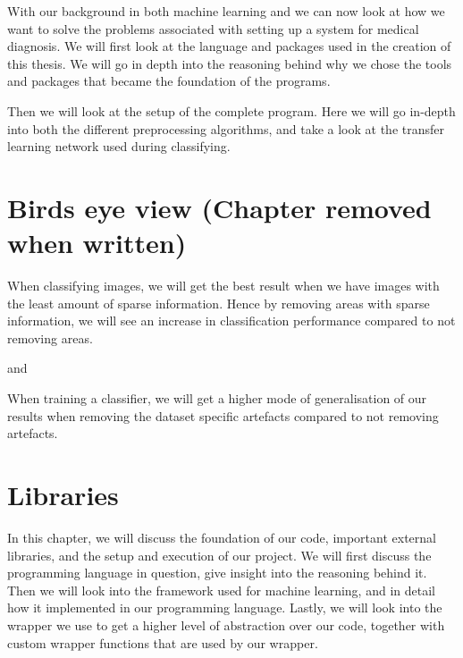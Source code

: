 With our background in both machine learning and  we can now look at how we want to solve the problems associated with setting up a system for medical diagnosis.  
We will first look at the language and packages used in the creation of this thesis. We will go in depth into the reasoning behind why we chose the tools and packages that became the foundation of the programs. 

Then we will look at the setup of the complete program. Here we will go in-depth into both the different preprocessing algorithms, and take a look at the transfer learning network used during classifying.
\section{Birds eye view (Chapter removed when written)}

\noindent
\begin{hyp} \label{hyp:a}
When classifying images, we will get the best result when we have images with the least amount of sparse information. 
Hence by removing areas with sparse information,
we will see an increase in classification performance compared to not removing areas.
\end{hyp}

\noindent
and

\noindent 
\begin{hyp} \label{hyp:b}
When training a classifier, we will get a higher
mode of generalisation of our results when removing the dataset
specific artefacts compared to not removing artefacts.
\end{hyp}
\vspace{5px}

\section{Libraries} 
In this chapter, we will discuss the foundation of our code, important external libraries, and the setup and execution of our project.  
We will first discuss the programming language in question, give insight into the reasoning behind it. Then we will look into the framework used for machine learning, and in detail how it implemented in our programming language. Lastly, we will look into the wrapper we use to get a higher level of abstraction over our code, together with custom wrapper functions that are used by our wrapper. 

